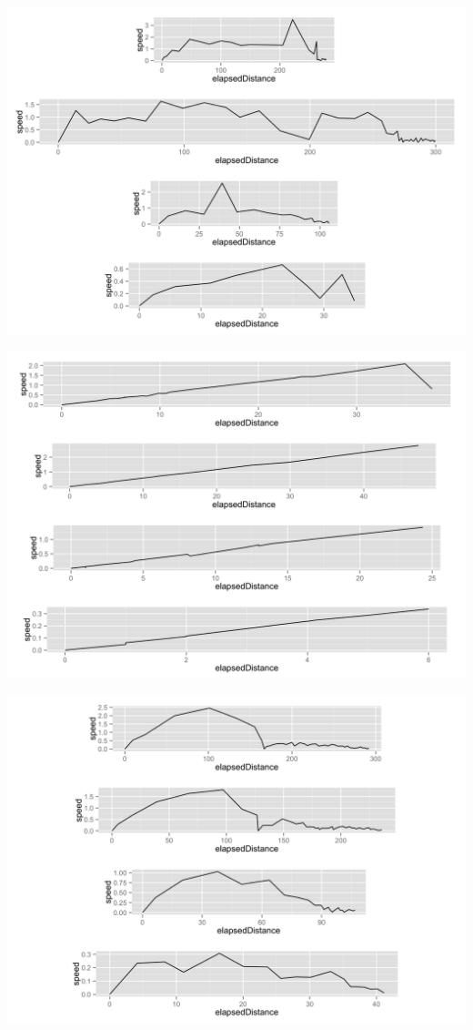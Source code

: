 \begin{appendices}
\begin{minipage}{\textwidth}
	\begin{minipage}{0.5\linewidth}
		\includegraphics[width=\linewidth]{images/plots/plot_speed_individual_166}
	\end{minipage}
		\begin{minipage}{0.5\linewidth}
		\includegraphics[width=\linewidth]{images/plots/plot_speed_individual_225}
	\end{minipage}
	\begin{minipage}{0.5\linewidth}
		\includegraphics[width=\linewidth]{images/plots/plot_speed_individual_239}

\end{minipage}
\end{minipage}
\end{appendices}
